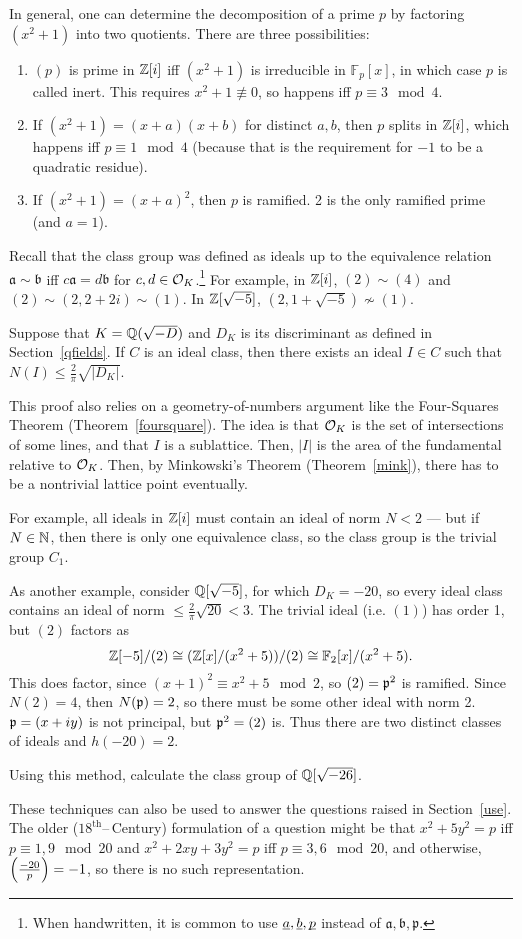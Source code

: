 In general, one can determine the decomposition of a prime $p$ by factoring $(x^2+1)$ into two quotients. There are three possibilities:
\begin{enumerate}
\item $(p)$ is prime in $\mathbb{Z}[i]$ iff $(x^2+1)$ is irreducible in $\mathbb F_p[x]$, in which case $p$ is called inert. This requires $x^2+1\not\equiv 0$, so happens iff $p \equiv 3\mod 4$.
\item If $(x^2+1) = (x+a)(x+b)$ for distinct $a,b$, then $p$ splits in $\mathbb{Z}[i]$, which happens iff $p \equiv 1\mod 4$ (because that is the requirement for $-1$ to be a quadratic residue).
\item If $(x^2+1) = (x+a)^2$, then $p$ is ramified. 2 is the only ramified prime (and $a = 1$).
\end{enumerate}
Recall that the class group was defined as ideals up to the equivalence relation $\mathfrak a \sim \mathfrak b$ iff $c\mathfrak a = d\mathfrak b$ for $c,d\in\mathcal{O}_K$.\footnote{When handwritten, it is common to use $\underline{a},\underline{b},\underline{\smash p}$ instead of $\mathfrak a,\mathfrak b,\mathfrak p$.} For example, in $\mathbb{Z}[i]$, $(2)\sim (4)$ and $(2)\sim (2,2+2i)\sim (1)$. In $\mathbb{Z}[\sqrt{-5}]$, $(2,1+\sqrt{-5}) \nsim (1)$.
\begin{thm}
Suppose that $K = \mathbb{Q}(\sqrt{-D})$ and $D_K$ is its discriminant as defined in Section~\ref{qfields}. If $C$ is an ideal class, then there exists an ideal $I\in C$ such that $N(I) \le \frac{2}{\pi}\sqrt{|D_K|}$.
\end{thm}
This proof also relies on a geometry-of-numbers argument like the Four-Squares Theorem (Theorem~\ref{foursquare}). The idea is that $\mathcal{O}_K$ is the set of intersections of some lines, and that $I$ is a sublattice. Then, $|I|$ is the area of the fundamental \pgram{} relative to $\mathcal{O}_K$. Then, by Minkowski's Theorem (Theorem~\ref{mink}), there has to be a nontrivial lattice point eventually.

For example, all ideals in $\mathbb{Z}[i]$ must contain an ideal of norm $N<2$ ---  but if $N\in\mathbb{N}$, then there is only one equivalence class, so the class group is the trivial group $C_1$.

As another example, consider $\mathbb{Q}[\sqrt{-5}]$, for which $D_K = -20$, so every ideal class contains an ideal of norm $\le \frac{2}{\pi}\sqrt{20} < 3$. The trivial ideal (i.e. $(1)$) has order 1, but $(2)$ factors as
\[\mathbb{Z}[-5]/(2) \cong (\mathbb{Z}[x]/(x^2+5))/(2) \cong\mathbb F_2[x]/(x^2+5).\]
This does factor, since $(x+1)^2 \equiv x^2+5\mod 2$, so $(2) = \mathfrak p^2$ is ramified. Since $N(2) = 4$, then $N(\mathfrak p) = 2$, so there must be some other ideal with norm 2. $\mathfrak p = (x+iy)$ is not principal, but $\mathfrak p^2 = (2)$ is.
Thus there are two distinct classes of ideals and $h(-20) = 2$.
\begin{ex}
Using this method, calculate the class group of $\mathbb{Q}[\sqrt{-26}]$.
\end{ex}
These techniques can also be used to answer the questions raised in Section~\ref{use}. The older ($18^{\mathrm{th}}$--\,Century) formulation of a question might be that $x^2+5y^2 = p$ iff $p \equiv 1,9\mod 20$ and $x^2+2xy+3y^2 = p$ iff $p \equiv 3,6\mod 20$, and otherwise, $\left(\frac{-20}{p}\right) = -1$, so there is no such representation.

